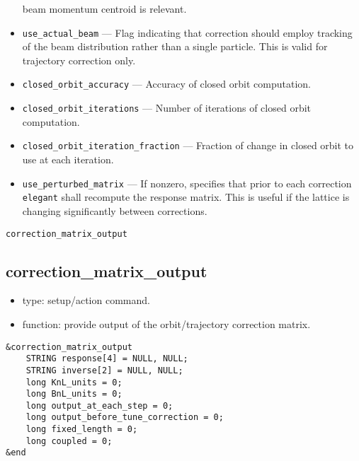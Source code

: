 \documentclass[11pt]{article}
\begin{document}
\begin{itemize}
beam momentum centroid is relevant.
\item \verb|use_actual_beam| --- Flag indicating that correction
should employ tracking of the beam distribution rather than a single
particle.  This is valid for trajectory correction only.
\item \verb|closed_orbit_accuracy| --- Accuracy of closed orbit computation.
\item \verb|closed_orbit_iterations| --- Number of iterations of closed orbit computation.
\item \verb|closed_orbit_iteration_fraction| --- Fraction of change in closed orbit to
use at each iteration.
\item \verb|use_perturbed_matrix| --- If nonzero, specifies that prior to each 
	correction \verb|elegant| shall recompute the response matrix.  This
	is useful if the lattice is changing significantly between corrections.
\end{itemize}

\begin{latexonly}
\newpage
\begin{center}{\Large\verb|correction_matrix_output|}\end{center}
\end{latexonly}
\subsection{correction\_matrix\_output \label{subsec:correctionmatrixoutput}}

\begin{itemize}
\item type: setup/action command.
\item function: provide output of the orbit/trajectory correction matrix.
\end{itemize}

\begin{verbatim}
&correction_matrix_output
    STRING response[4] = NULL, NULL;
    STRING inverse[2] = NULL, NULL;
    long KnL_units = 0;
    long BnL_units = 0;
    long output_at_each_step = 0;
    long output_before_tune_correction = 0;
    long fixed_length = 0;
    long coupled = 0;
&end
\end{verbatim}
\end{document}
